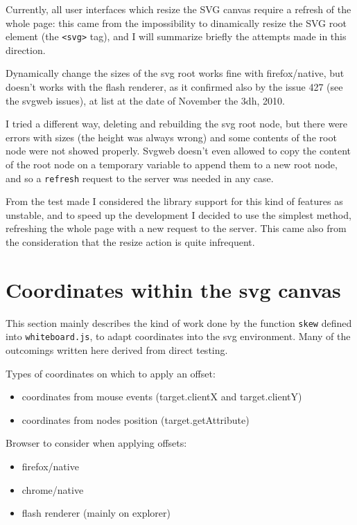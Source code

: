 \documentclass[10pt,a4paper,english]{book}
\begin{document}
Currently, all user interfaces which resize the SVG canvas require a
refresh of the whole page: this came from the impossibility to
dinamically resize the SVG root element (the \texttt{<svg>} tag), and I
will summarize briefly the attempts made in this direction.

Dynamically change the sizes of the svg root works fine with
firefox/native, but doesn't works with the flash renderer, as it
confirmed also by the issue 427 (see the svgweb issues), at list at
the date of November the 3dh, 2010.

I tried a different way, deleting and rebuilding the svg root node,
but there were errors with sizes (the height was always wrong) and
some contents of the root node were not showed properly. Svgweb
doesn't even allowed to copy the content of the root node on a
temporary variable to append them to a new root node, and so a
\texttt{refresh} request to the server was needed in any case.

From the test made I considered the library support for this kind of
features as unstable, and to speed up the development I decided to use
the simplest method, refreshing the whole page with a new request to
the server. This came also from the consideration that the resize
action is quite infrequent.



\hypertarget{coordinates-within-the-svg-canvas}{}
\section{Coordinates within the svg canvas}
\label{coordinates-within-the-svg-canvas}

This section mainly describes the kind of work done by the function
\texttt{skew} defined into \texttt{whiteboard.js}, to adapt coordinates into the
svg environment. Many of the outcomings written here derived from
direct testing.

Types of coordinates on which to apply an offset:
\begin{itemize}
\item {} 
coordinates from mouse events (target.clientX and target.clientY)

\item {} 
coordinates from nodes position (target.getAttribute)

\end{itemize}

Browser to consider when applying offsets:
\begin{itemize}
\item {} 
firefox/native

\item {} 
chrome/native

\item {} 
flash renderer (mainly on explorer)

\end{itemize}
\end{document}
